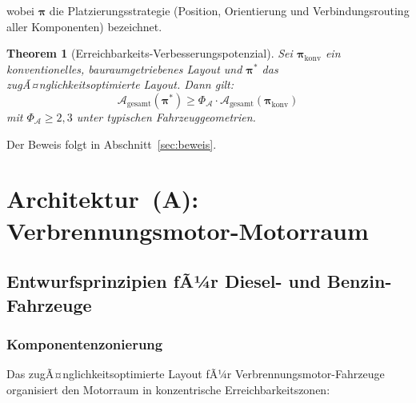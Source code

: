 ﻿\documentclass[12pt,a4paper]{article}
\newtheorem{theorem}{Theorem}[section]
\begin{document}
wobei $\boldsymbol{\pi}$ die Platzierungsstrategie (Position, Orientierung und
Verbindungsrouting aller Komponenten) bezeichnet.

\begin{theorem}[Erreichbarkeits-Verbesserungspotenzial]
	\label{thm:erreichbarkeit}
	Sei $\boldsymbol{\pi}_\mathrm{konv}$ ein konventionelles, bauraumgetriebenes
	Layout und $\boldsymbol{\pi}^*$ das zugÃ¤nglichkeitsoptimierte Layout. Dann gilt:
	\begin{equation}
		\mathcal{A}_\mathrm{gesamt}(\boldsymbol{\pi}^*) \geq
		\Phi_\mathcal{A} \cdot \mathcal{A}_\mathrm{gesamt}(\boldsymbol{\pi}_\mathrm{konv})
		\label{eq:erreichbarkeits_theorem}
	\end{equation}
	mit $\Phi_\mathcal{A} \geq 2{,}3$ unter typischen Fahrzeuggeometrien.
\end{theorem}

Der Beweis folgt in Abschnitt~\ref{sec:beweis}.

\section{Architektur~(A): Verbrennungsmotor-Motorraum}
\label{sec:architektur_a}

\subsection{Entwurfsprinzipien fÃ¼r Diesel- und Benzin-Fahrzeuge}

\subsubsection{Komponentenzonierung}

Das zugÃ¤nglichkeitsoptimierte Layout fÃ¼r Verbrennungsmotor-Fahrzeuge organisiert
den Motorraum in konzentrische Erreichbarkeitszonen:
\end{document}
